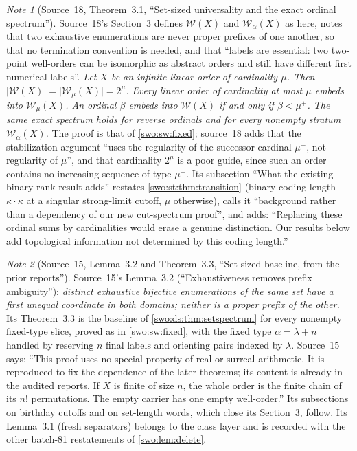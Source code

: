 \documentclass[11pt]{article}
\theoremstyle{definition}
\theoremstyle{remark}
\newtheorem{note}[note]{Note}
\newcommand{\WO}{\mathcal W}
\newcommand{\card}[1]{\lvert #1\rvert}
\begin{document}
\begin{note}[Source~18, Theorem~3.1, ``Set-sized universality and the exact ordinal spectrum'']\label{swo:sh:thm:set-spectrum}\label{swo:sh:sec:fixed}
Source~18's Section~3 defines $\WO(X)$ and $\WO_\alpha(X)$ as here, notes that
two exhaustive enumerations are never proper prefixes of one another, so that
no termination convention is needed, and that ``labels are essential: two
two-point well-orders can be isomorphic as abstract orders and still have
different first numerical labels''. \emph{Let $X$ be an infinite linear order of
cardinality $\mu$. Then $\card{\WO(X)}=\card{\WO_\mu(X)}=2^\mu$. Every linear
order of cardinality at most $\mu$ embeds into $\WO_\mu(X)$. An ordinal $\beta$
embeds into $\WO(X)$ if and only if $\beta<\mu^+$. The same exact spectrum holds
for reverse ordinals and for every nonempty stratum $\WO_\alpha(X)$.} The proof
is that of \cref{swo:sw:fixed}; source~18 adds that the stabilization argument
``uses the regularity of the successor cardinal $\mu^+$, not regularity of
$\mu$'', and that cardinality $2^\mu$ is a poor guide, since such an order
contains no increasing sequence of type $\mu^+$. Its subsection ``What the
existing binary-rank result adds'' restates \cref{swo:st:thm:transition}
(binary coding length $\kappa\cdot\kappa$ at a singular strong-limit cutoff,
$\mu$ otherwise), calls it ``background rather than a dependency of our new
cut-spectrum proof'', and adds: ``Replacing these ordinal sums by
cardinalities would erase a genuine distinction. Our results below add
topological information not determined by this coding length.''
\end{note}

\begin{note}[Source~15, Lemma~3.2 and Theorem~3.3, ``Set-sized baseline, from the prior reports'']\label{swo:cb:lem:prefixfree}\label{swo:cb:thm:sets}\label{swo:cb:sec:baseline}
Source~15's Lemma~3.2 (``Exhaustiveness removes prefix ambiguity''):
\emph{distinct exhaustive bijective enumerations of the same set have a first
unequal coordinate in both domains; neither is a proper prefix of the other.}
Its Theorem~3.3 is the baseline of \cref{swo:ds:thm:setspectrum} for every
nonempty fixed-type slice, proved as in \cref{swo:sw:fixed}, with the fixed type
$\alpha=\lambda+n$ handled by reserving $n$ final labels and orienting pairs
indexed by $\lambda$. Source~15 says: ``This proof uses no special property of
real or surreal arithmetic. It is reproduced to fix the dependence of the
later theorems; its content is already in the audited reports. If $X$ is
finite of size $n$, the whole order is the finite chain of its $n!$
permutations. The empty carrier has one empty well-order.'' Its subsections on
birthday cutoffs and on set-length words, which close its Section~3, follow.
Its Lemma~3.1 (fresh separators) belongs to the class layer and is recorded
with the other batch-81 restatements of \cref{swo:lem:delete}.
\end{note}
\end{document}
